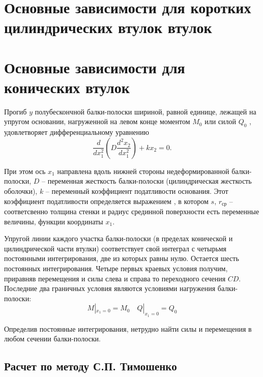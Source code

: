 \section{Основные зависимости для коротких цилиндрических втулок втулок}
\label{ShortConicalSleeve}





\section{Основные зависимости для конических втулок}
\label{ConicalSleeve}

Прогиб $y$ полубескончной балки-полоски шириной, равной единице, лежащей на упругом основании, нагруженной на левом конце моментом $M_0$ или силой $Q_0$ , удовлетворяет дифференциальному уравнению 
\begin{equation}
  \label{ConicalSleeve_eq1}
  \frac{d}{dx_1^2} \left( D \frac{d^2 x_2}{dx_1^2} \right)+kx_2=0.  
\end{equation}

При этом ось $x_1$ направлена вдоль нижней стороны недеформированной балки-полоски, $D$ -- переменная жесткость балки-полоски (цилиндрическая жесткость оболочки), $k$ -- переменный коэффициент податливости основания.
Этот коэффициент податливости определяется выражением , в котором $s$, $r_{\text{ср}}$ -- соответсвенно толщина стенки и радиус срединной поверхности есть переменные величины, функции координаты $x_1$.

Упругой линии каждого участка балки-полоски (в пределах конической и цилиндрической части втулки) соответствует свой интеграл с четырьмя постоянными интегрирования, две из которых равны нулю.
Остается шесть постоянных интегрирования.
Четыре первых краевых условия получим, приравняв перемещения и силы слева и справа то переходного сечения $CD$.
Последние два граничных условия являются условиями нагружения балки-полоски:
\begin{equation}
  \label{ConicalSleeve_eq2}
    M|_{x_1=0}=M_0 \quad Q|_{x_1=0}=Q_0 
\end{equation}

Определив постоянные интегрирования, нетрудно найти силы и перемещения в любом сечении балки-полоски.

\subsection{Расчет по методу С.П. Тимошенко}
\label{Timoshenko}

